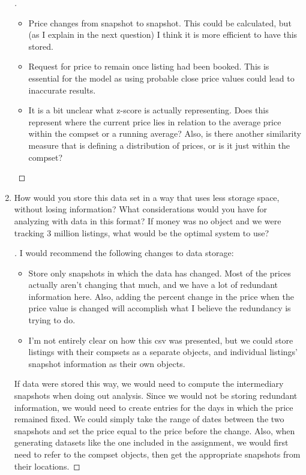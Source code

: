 \documentclass[]{article}
\theoremstyle{definition}
\begin{document}
\begin{enumerate}
\begin{proof}[\unskip\nopunct]
\begin{itemize}
		\item Price changes from snapshot to snapshot. This could be calculated, but (as I explain in the next question) I think it is more efficient to have this stored.

		\item Request for price to remain once listing had been booked. This is essential for the model as using probable close price values could lead to inaccurate results.

		\item It is a bit unclear what z-score is actually representing. Does this represent where the current price lies in relation to the average price within the compset or a running average? Also, is there another similarity measure that is defining a distribution of prices, or is it just within the compset? 

	\end{itemize}	
\end{proof}

\item How would you store this data set in a way that uses less storage space, without losing information?  What considerations would you have for analyzing with data in this format? If money was no object and we were tracking 3 million listings, what would be the optimal system to use?

\begin{proof}[\unskip\nopunct]\renewcommand{\qedsymbol}{}

I would recommend the following changes to data storage:

	\begin{itemize}
		\item Store only snapshots in which the data has changed. Most of the prices actually aren't changing that much, and we have a lot of redundant information here. Also, adding the percent change in the price when the price value is changed will accomplish what I believe the redundancy is trying to do.

		\item I'm not entirely clear on how this csv was presented, but we could store listings with their compsets as a separate objects, and individual listings' snapshot information as their own objects.

	\end{itemize}

If data were stored this way, we would need to compute the intermediary snapshots when doing out analysis. Since we would not be storing redundant information, we would need to create entries for the days in which the price remained fixed. We could simply take the range of dates between the two snapshots and set the price equal to the price before the change. Also, when generating datasets like the one included in the assignment, we would first need to refer to the compset objects, then get the appropriate snapshots from their locations.


\end{proof}
\end{enumerate}
\end{document}
